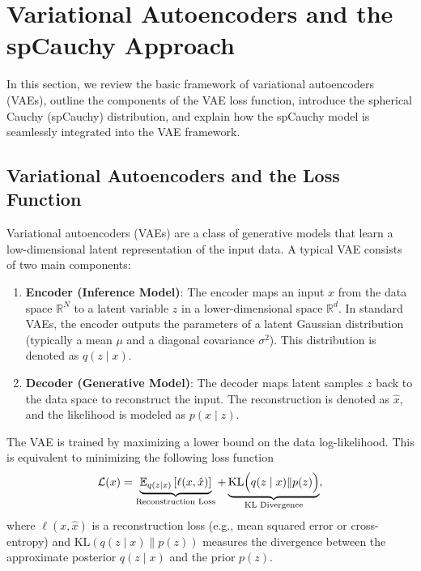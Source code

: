 \documentclass{article}
\begin{document}
\section{Variational Autoencoders and the spCauchy Approach}

In this section, we review the basic framework of variational autoencoders (VAEs), outline the components of the VAE loss function, introduce the spherical Cauchy (spCauchy) distribution, and explain how the spCauchy model is seamlessly integrated into the VAE framework.


\subsection{Variational Autoencoders and the Loss Function}

Variational autoencoders (VAEs) are a class of generative models that learn a low-dimensional latent representation of the input data. A typical VAE consists of two main components:

\begin{enumerate}
    \item \textbf{Encoder (Inference Model)}:  
    The encoder maps an input \( x \) from the data space \(\mathbb{R}^N\) to a latent variable \( z \) in a lower-dimensional space \(\mathbb{R}^d\). In standard VAEs, the encoder outputs the parameters of a latent Gaussian distribution (typically a mean \(\mu\) and a diagonal covariance \(\sigma^2\)). This distribution is denoted as \(q(z \mid x)\).

    \item \textbf{Decoder (Generative Model)}:  
    The decoder maps latent samples \( z \) back to the data space to reconstruct the input. The reconstruction is denoted as \(\hat{x}\), and the likelihood is modeled as \(p(x \mid z)\).
\end{enumerate}


The VAE is trained by maximizing a lower bound on the data log-likelihood. This is equivalent to minimizing the following loss function
\[
\mathcal{L}(x) = \underbrace{\mathbb{E}_{q(z \mid x)}\left[\ell(x, \hat{x})\right]}_{\text{Reconstruction Loss}} + \underbrace{\mathrm{KL}\Bigl(q(z \mid x) \| p(z)\Bigr)}_{\text{KL Divergence}},
\]
where
\(\ell(x, \hat{x})\) is a reconstruction loss (e.g., mean squared error or cross-entropy) and \(\mathrm{KL}(q(z \mid x) \| p(z))\) measures the divergence between the approximate posterior \(q(z \mid x)\) and the prior \(p(z)\).
\end{document}

